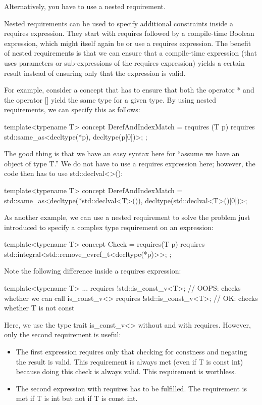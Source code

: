 Alternatively, you have to use a nested requirement.


Nested requirements can be used to specify additional constraints inside a requires expression. They start with requires followed by a compile-time Boolean expression, which might itself again be or use a requires expression. The benefit of nested requirements is that we can ensure that a compile-time expression (that uses parameters or sub-expressions of the requires expression) yields a certain result instead of ensuring only that the expression is valid.

For example, consider a concept that has to ensure that both the operator * and the operator [] yield the same type for a given type. By using nested requirements, we can specify this as follows:

\begin{cpp}
template<typename T>
concept DerefAndIndexMatch = requires (T p) {
								requires std::same_as<decltype(*p),
										decltype(p[0])>;
							};
\end{cpp}

The good thing is that we have an easy syntax here for “assume we have an object of type T.” We do not have to use a requires expression here; however, the code then has to use std::declval<>():

\begin{cpp}
template<typename T>
concept DerefAndIndexMatch = std::same_as<decltype(*std::declval<T>()),
			 decltype(std::declval<T>()[0])>;
\end{cpp}

As another example, we can use a nested requirement to solve the problem just introduced to specify a complex type requirement on an expression:

\begin{cpp}
template<typename T>
concept Check = requires(T p) {
	requires std::integral<std::remove_cvref_t<decltype(*p)>>;
};
\end{cpp}

Note the following difference inside a requires expression:

\begin{cpp}
template<typename T>
... requires {
	!std::is_const_v<T>; // OOPS: checks whether we can call is_const_v<>
	requires !std::is_const_v<T>; // OK: checks whether T is not const
}
\end{cpp}

Here, we use the type trait is\_const\_v<> without and with requires. However, only the second requirement is useful:

\begin{itemize}
\item
The first expression requires only that checking for constness and negating the result is valid. This requirement is always met (even if T is const int) because doing this check is always valid. This requirement is worthless.

\item
The second expression with requires has to be fulfilled. The requirement is met if T is int but not if T is const int.
\end{itemize}

